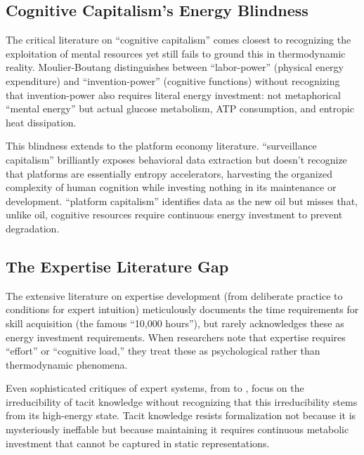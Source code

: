 \subsection{Cognitive Capitalism's Energy Blindness}

The critical literature on ``cognitive capitalism'' \citep{moulierboutang2007, vercellone2007} comes closest to recognizing the exploitation of mental resources yet still fails to ground this in thermodynamic reality. Moulier-Boutang distinguishes between ``labor-power'' (physical energy expenditure) and ``invention-power'' (cognitive functions) without recognizing that invention-power also requires literal energy investment: not metaphorical ``mental energy'' but actual glucose metabolism, ATP consumption, and entropic heat dissipation.

This blindness extends to the platform economy literature. \citet{zuboff2019} ``surveillance capitalism'' brilliantly exposes behavioral data extraction but doesn't recognize that platforms are essentially entropy accelerators, harvesting the organized complexity of human cognition while investing nothing in its maintenance or development. \citet{srnicek2017} ``platform capitalism'' identifies data as the new oil but misses that, unlike oil, cognitive resources require continuous energy investment to prevent degradation.

\subsection{The Expertise Literature Gap}

The extensive literature on expertise development (from \citet{ericsson2006} deliberate practice to \citet{kahneman2009} conditions for expert intuition) meticulously documents the time requirements for skill acquisition (the famous ``10,000 hours''), but rarely acknowledges these as energy investment requirements. When researchers note that expertise requires ``effort'' or ``cognitive load,'' they treat these as psychological rather than thermodynamic phenomena.

Even sophisticated critiques of expert systems, from \citet{dreyfus1979} to \citet{collins2010}, focus on the irreducibility of tacit knowledge without recognizing that this irreducibility stems from its high-energy state. Tacit knowledge resists formalization not because it is mysteriously ineffable but because maintaining it requires continuous metabolic investment that cannot be captured in static representations.

